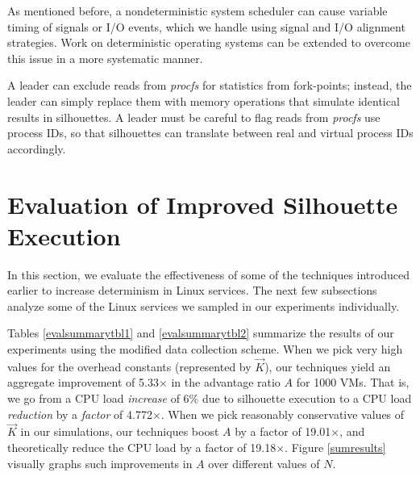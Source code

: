 As mentioned before, a nondeterministic system scheduler
can cause variable timing of signals or I/O events, which
we handle using signal and I/O alignment strategies. 
Work on deterministic operating systems can
be extended to overcome this issue
in a more systematic manner. \newline

 \newline
A leader can exclude reads from {\em procfs}
for statistics from fork-points; instead, the leader can simply replace
them with memory operations that simulate
identical results in silhouettes. A leader
must be careful to flag reads from {\em procfs}
use process IDs, so that silhouettes
can translate between real and virtual process IDs
accordingly.

\newpage
\section{Evaluation of Improved Silhouette Execution} \label{sileval}
In this section, we evaluate the effectiveness of some of the techniques
introduced earlier to increase determinism in Linux services.
The next few subsections analyze some of 
the Linux services we sampled in our experiments
individually.

Tables \ref{evalsummarytbl1} and \ref{evalsummarytbl2} summarize the results of our experiments
using the modified data collection scheme. When we pick very high values for the overhead constants (represented by $\vec K$),
our techniques yield an aggregate improvement of 5.33$\times$
in the advantage ratio $A$ for 1000 VMs. That is, 
we go from a CPU load {\em increase} of 6\% due
to silhouette execution to a CPU load {\em reduction} by a 
{\em factor} of 4.772$\times$. When we pick reasonably conservative
values of $\vec K$ in our simulations, our techniques boost $A$ by a factor of 19.01$\times$,
and theoretically reduce the CPU load by a factor of 19.18$\times$.
Figure \ref{sumresults} visually graphs such improvements 
in $A$ over different values of $N$.

